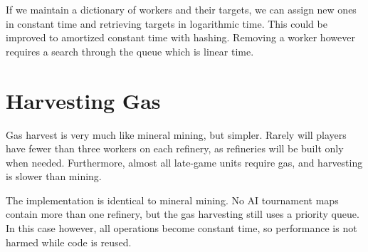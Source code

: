 If we maintain a dictionary of workers and their targets, we can assign new ones in constant time and retrieving targets in logarithmic time. This could be improved to amortized constant time with hashing. Removing a worker however requires a search through the queue which is linear time.


\section{Harvesting Gas}	
Gas harvest is very much like mineral mining, but simpler. Rarely will players have fewer than three workers on each refinery, as refineries will be built only when needed. Furthermore, almost all late-game units require gas, and harvesting is slower than mining.

The implementation is identical to mineral mining. No AI tournament maps contain more than one refinery, but the gas harvesting still uses a priority queue. In this case however, all operations become constant time, so performance is not harmed while code is reused.